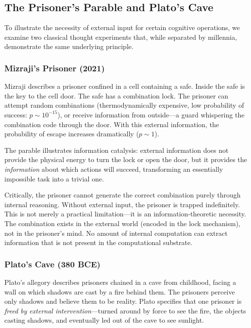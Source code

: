 \documentclass[11pt,a4paper]{article}
\begin{document}
\subsection{The Prisoner's Parable and Plato's Cave}

To illustrate the necessity of external input for certain cognitive operations, we examine two classical thought experiments that, while separated by millennia, demonstrate the same underlying principle.

\subsubsection{Mizraji's Prisoner (2021)}

Mizraji describes a prisoner confined in a cell containing a safe. Inside the safe is the key to the cell door. The safe has a combination lock. The prisoner can attempt random combinations (thermodynamically expensive, low probability of success: $p \sim 10^{-15}$), or receive information from outside—a guard whispering the combination code through the door. With this external information, the probability of escape increases dramatically ($p \sim 1$).

The parable illustrates information catalysis: external information does not provide the physical energy to turn the lock or open the door, but it provides the \textit{information} about which actions will succeed, transforming an essentially impossible task into a trivial one.

Critically, the prisoner cannot generate the correct combination purely through internal reasoning. Without external input, the prisoner is trapped indefinitely. This is not merely a practical limitation—it is an information-theoretic necessity. The combination exists in the external world (encoded in the lock mechanism), not in the prisoner's mind. No amount of internal computation can extract information that is not present in the computational substrate.

\subsubsection{Plato's Cave (380 BCE)}

Plato's allegory describes prisoners chained in a cave from childhood, facing a wall on which shadows are cast by a fire behind them. The prisoners perceive only shadows and believe them to be reality. Plato specifies that one prisoner is \textit{freed by external intervention}—turned around by force to see the fire, the objects casting shadows, and eventually led out of the cave to see sunlight.
\end{document}
